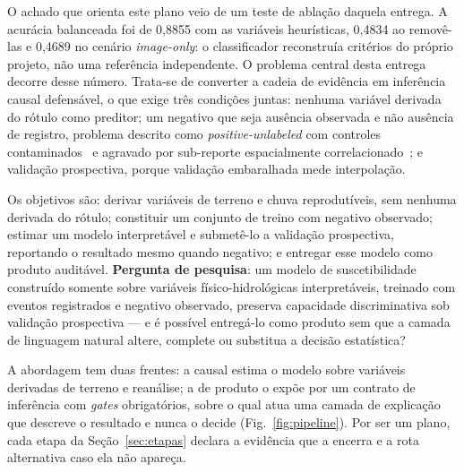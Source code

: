 \documentclass[conference]{IEEEtran}
\begin{document}
O achado que orienta este plano veio de um teste de ablação daquela entrega. A
acurácia balanceada foi de 0,8855 com as variáveis heurísticas, 0,4834 ao
removê-las e 0,4689 no cenário \emph{image-only}: o classificador reconstruía
critérios do próprio projeto, não uma referência independente. O problema central
desta entrega decorre desse número. Trata-se de converter a cadeia de evidência
em inferência causal defensável, o que exige três condições juntas: nenhuma
variável derivada do rótulo como preditor; um negativo que seja ausência
observada e não ausência de registro, problema descrito como
\emph{positive-unlabeled} com controles contaminados~\cite{li2022pul} e agravado
por sub-reporte espacialmente correlacionado~\cite{agostini2024}; e validação
prospectiva, porque validação embaralhada mede interpolação.

Os objetivos são: derivar variáveis de terreno e chuva reprodutíveis, sem
nenhuma derivada do rótulo; constituir um conjunto de treino com
negativo observado; estimar um modelo interpretável e submetê-lo a validação
prospectiva, reportando o resultado mesmo quando negativo; e entregar esse modelo
como produto auditável. \textbf{Pergunta de pesquisa}: um modelo de
suscetibilidade construído somente sobre variáveis físico-hidrológicas
interpretáveis, treinado com eventos registrados e negativo observado, preserva
capacidade discriminativa sob validação prospectiva --- e é possível entregá-lo
como produto sem que a camada de linguagem natural altere, complete ou substitua
a decisão estatística?

A abordagem tem duas frentes: a causal estima o modelo sobre variáveis derivadas
de terreno e reanálise; a de produto o expõe por um contrato de inferência com
\emph{gates} obrigatórios, sobre o qual atua uma camada de explicação que
descreve o resultado e nunca o decide (Fig.~\ref{fig:pipeline}). Por ser um
plano, cada etapa da Seção~\ref{sec:etapas} declara a evidência que a encerra e a
rota alternativa caso ela não apareça.
\end{document}
